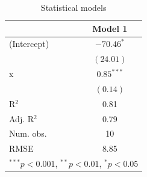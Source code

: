 \documentclass[14pt,aspectratio=1610]{beamer}
\begin{document}

\begin{frame}{}
\frametitle{ }
\begin{block}{}
\justifying
\begin{table}
\begin{center}
\begin{tabular}{lc}
\hline
 & Model 1 \\
\hline
(Intercept) & $-70.46^{*}$ \\
            & $(24.01)$    \\
x           & $0.85^{***}$ \\
            & $(0.14)$     \\
\hline
R$^2$       & 0.81         \\
Adj. R$^2$  & 0.79         \\
Num. obs.   & 10           \\
RMSE        & 8.85         \\
\hline
\multicolumn{2}{l}{\scriptsize{$^{***}p<0.001$, $^{**}p<0.01$, $^*p<0.05$}}
\end{tabular}
\caption{Statistical models}
\label{table:coefficients}
\end{center}
\end{table} 
\end{block}
\end{frame}
\end{document}
